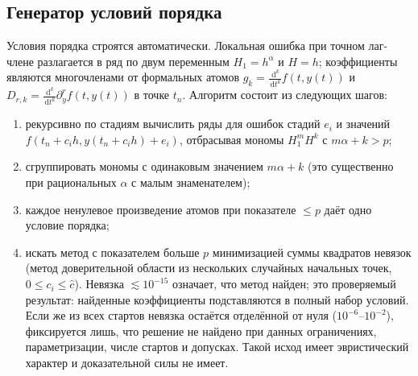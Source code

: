 \documentclass[11pt,a4paper]{article}
\theoremstyle{plain}
\theoremstyle{definition}
\newcommand{\dd}{\,\mathrm{d}}
\begin{document}
\subsection{Генератор условий порядка}\label{sec:generator}

Условия порядка строятся автоматически. Локальная ошибка при точном лаг-члене разлагается в ряд по двум переменным $H_1=h^{\alpha}$ и $H=h$; коэффициенты являются многочленами от формальных атомов $g_k=\frac{\dd^k}{\dd t^k}f(t,y(t))$ и $D_{r,k}=\frac{\dd^k}{\dd t^k}\partial_y^rf(t,y(t))$ в точке $t_n$. Алгоритм состоит из следующих шагов:
\begin{enumerate}
\item рекурсивно по стадиям вычислить ряды для ошибок стадий $e_i$ и значений $f(t_n+c_ih,y(t_n+c_ih)+e_i)$, отбрасывая мономы $H_1^mH^k$ с $m\alpha+k>p$;
\item сгруппировать мономы с одинаковым значением $m\alpha+k$ (это существенно при рациональных $\alpha$ с малым знаменателем);
\item каждое ненулевое произведение атомов при показателе $\le p$ даёт одно условие порядка;
\item искать метод с показателем больше $p$ минимизацией суммы квадратов невязок (метод доверительной области из нескольких случайных начальных точек, $0\le c_i\le\hat c$). Невязка $\lesssim10^{-15}$ означает, что метод найден; это проверяемый результат: найденные коэффициенты подставляются в полный набор условий. Если же из всех стартов невязка остаётся отделённой от нуля ($10^{-6}$--$10^{-2}$), фиксируется лишь, что решение не найдено при данных ограничениях, параметризации, числе стартов и допусках. Такой исход имеет эвристический характер и доказательной силы не имеет.
\end{enumerate}
\end{document}
